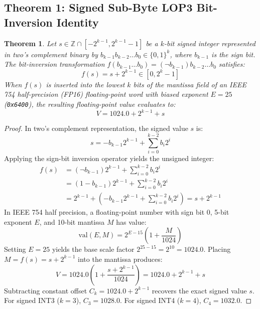 \documentclass[10pt,twocolumn,letterpaper]{article}
\newtheorem{theorem}{Theorem}
\begin{document}
\subsection{Theorem 1: Signed Sub-Byte LOP3 Bit-Inversion Identity}
\begin{theorem}
Let $s \in \mathbb{Z} \cap [-2^{k-1}, 2^{k-1}-1]$ be a $k$-bit signed integer represented in two's complement binary by $b_{k-1} b_{k-2} \dots b_0 \in \{0, 1\}^k$, where $b_{k-1}$ is the sign bit. The bit-inversion transformation $f(b_{k-1} \dots b_0) = (\neg b_{k-1}) b_{k-2} \dots b_0$ satisfies:
\begin{equation}
f(s) = s + 2^{k-1} \in [0, 2^k - 1]
\end{equation}
When $f(s)$ is inserted into the lowest $k$ bits of the mantissa field of an IEEE 754 half-precision (FP16) floating-point word with biased exponent $E = 25$ (\texttt{0x6400}), the resulting floating-point value evaluates to:
\begin{equation}
V = 1024.0 + 2^{k-1} + s
\end{equation}
\end{theorem}

\begin{proof}
In two's complement representation, the signed value $s$ is:
\begin{equation}
s = -b_{k-1} 2^{k-1} + \sum_{i=0}^{k-2} b_i 2^i
\end{equation}
Applying the sign-bit inversion operator yields the unsigned integer:
\begin{align}
f(s) &= (\neg b_{k-1}) 2^{k-1} + \sum_{i=0}^{k-2} b_i 2^i \\
     &= (1 - b_{k-1}) 2^{k-1} + \sum_{i=0}^{k-2} b_i 2^i \\
     &= 2^{k-1} + \left( -b_{k-1} 2^{k-1} + \sum_{i=0}^{k-2} b_i 2^i \right) = s + 2^{k-1}
\end{align}
In IEEE 754 half precision, a floating-point number with sign bit 0, 5-bit exponent $E$, and 10-bit mantissa $M$ has value:
\begin{equation}
\text{val}(E, M) = 2^{E - 15} \left( 1 + \frac{M}{1024} \right)
\end{equation}
Setting $E = 25$ yields the base scale factor $2^{25 - 15} = 2^{10} = 1024.0$. Placing $M = f(s) = s + 2^{k-1}$ into the mantissa produces:
\begin{equation}
V = 1024.0 \left( 1 + \frac{s + 2^{k-1}}{1024} \right) = 1024.0 + 2^{k-1} + s
\end{equation}
Subtracting constant offset $C_k = 1024.0 + 2^{k-1}$ recovers the exact signed value $s$. For signed INT3 ($k=3$), $C_3 = 1028.0$. For signed INT4 ($k=4$), $C_4 = 1032.0$.
\end{proof}
\end{document}
